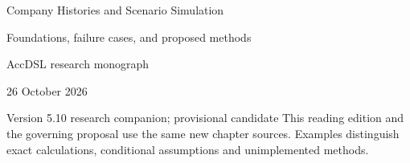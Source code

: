 \documentclass[11pt,a4paper]{report}
\begin{document}
\hypersetup{pageanchor=false}
\begin{titlepage}
{\Huge Company Histories and Scenario Simulation\par}
\vspace{12mm}
{\Large Foundations, failure cases, and proposed methods\par}
\vspace{8mm}
AccDSL research monograph\par 26 October 2026\par Version 5.10 research companion; provisional candidate
\vfill
This reading edition and the governing proposal use the same new chapter sources. Examples distinguish exact calculations, conditional assumptions and unimplemented methods.
\end{titlepage}
\hypersetup{pageanchor=true}
\tableofcontents
\clearpage{}


























\clearpage\label{sim:body-end}

\begingroup\raggedright
\endgroup
\end{document}
